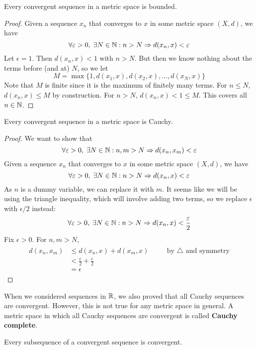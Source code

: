 \begin{prop}
  Every convergent sequence in a metric space is bounded.
\end{prop}
\begin{proof}
  Given a sequence $x_n$ that converges to $x$ in some metric space $(X, d)$, we have
  \[
    \forall \varepsilon > 0, \; \exists N \in \mathbb{N}: n > N \Rightarrow d(x_n, x) < \varepsilon
  \]
  Let $\epsilon = 1$. Then $d(x_n, x) < 1$ with $n > N$. But then we know nothing about the terms before (and at) $N$, so we let
  \[
    M = \max\{1, d(x_1, x), d(x_2, x), \ldots, d(x_N, x)\}
  \]
  Note that $M$ is finite since it is the maximum of finitely many terms. For $n \leq N$, $d(x_n, x) \leq M$ by construction. For $n > N$, $d(x_n, x) < 1 \leq M$. This covers all $n \in \mathbb{N}$.
\end{proof}
\begin{prop}
  Every convergent sequence in a metric space is Cauchy.
\end{prop}
\begin{proof}
  We want to show that
  \[
    \forall \varepsilon > 0, \; \exists N \in \mathbb{N}: n, m > N \Rightarrow d(x_n, x_m) < \varepsilon
  \]
  Given a sequence $x_n$ that converges to $x$ in some metric space $(X, d)$, we have
  \[
    \forall \varepsilon > 0, \; \exists N \in \mathbb{N}: n > N \Rightarrow d(x_n, x) < \varepsilon
  \]
  As $n$ is a dummy variable, we can replace it with $m$. It seems like we will be using the triangle inequality, which will involve adding two terms, so we replace $\epsilon$ with $\epsilon / 2$ instead:
  \[
    \forall \varepsilon > 0, \; \exists N \in \mathbb{N}: n > N \Rightarrow d(x_n, x) < \frac{\varepsilon}{2}
  \]
  Fix $\epsilon > 0$. For $n, m > N$,
  \begin{align*}
    \begin{aligned}
      d(x_n, x_m) &\leq d(x_n, x) + d(x_m, x) &&\quad \text{by $\triangle$ and symmetry} \\ 
      &< \frac{\epsilon}{2} + \frac{\epsilon}{2} \\ 
      &= \epsilon
    \end{aligned}
  \end{align*}
\end{proof}
When we considered sequences in $\mathbb{R}$, we also proved that all Cauchy sequences are convergent. However, this is not true for any metric space in general. A metric space in which all Cauchy sequences are convergent is called \textbf{Cauchy complete}.
\begin{prop}
  Every subsequence of a convergent sequence is convergent.
\end{prop}

